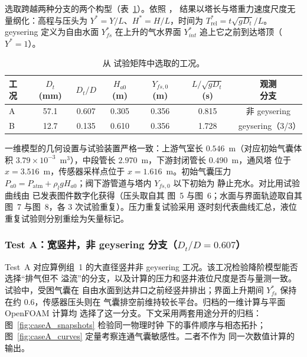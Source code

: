\documentclass[preprint,12pt]{elsarticle}
\begin{document}
选取跨越两种分支的两个构型（表~\ref{tab:cases}）。依照 \cite{vasconcelos2011}，
结果以塔长与塔重力速度尺度无量纲化：高程与压头为 $Y^{*}=Y/L$、$H^{*}=H/L$，时间为
$T_{\mathrm{rel}}^{*}=t\sqrt{gD_t}/L$。geysering 定义为自由水面 $Y^{*}_{fs}$ 在上升的气水界面
$Y^{*}_{int}$ 追上它之前到达塔顶（$Y^{*}=1$）。

\begin{table}[htbp]
\centering
\caption{从 \cite{vasconcelos2011} 试验矩阵中选取的工况。}
\label{tab:cases}
\begingroup
\small
\setlength{\tabcolsep}{3.5pt}
\begin{tabular}{@{}lcccccc@{}}
\toprule
工况 & \shortstack{$D_t$\\(mm)} & $D_t/D$ & \shortstack{$H_{a0}$\\(m)} &
\shortstack{$Y_{fs,0}$\\(m)} & \shortstack{$L/\sqrt{gD_t}$\\(s)} &
\shortstack{观测\\分支} \\
\midrule
A & 57.1 & 0.607 & 0.305 & 0.356 & 0.815 & 非 geysering \\
B & 12.7 & 0.135 & 0.610 & 0.356 & 1.728 & geysering（3/3） \\
\bottomrule
\end{tabular}
\endgroup
\end{table}

一维模型的几何设置与试验装置严格一致：上游气室长 $0.546$~m（对应初始气囊体积
$3.79\times10^{-3}$~m$^3$），中段管长 $2.970$~m，下游封闭管长 $0.490$~m，通风塔
位于 $x=3.516$~m，传感器采样点位于 $x=1.616$~m。初始气囊压力
$P_{a0}=P_{\mathrm{atm}}+\rho_l g H_{a0}$；阀下游管道与塔内 $Y_{fs,0}$ 以下初始为
静止充水。对比用试验曲线由 \cite{vasconcelos2011} 已发表图件数字化获得（压头取自其
图~5 与图~6；水面与界面轨迹取自其图~7 与图~8，各 3 次试验重复）。压力重复试验采用
逐时刻代表曲线汇总，液位重复试验则分别重绘为矢量标记。

\subsubsection{Test A：宽竖井，非 geysering 分支（$D_t/D=0.607$）}
\label{sec:tests:vw2011:caseA}

Test~A 对应算例组~1 的大直径竖井非 geysering 工况。该工况检验降阶模型能否选择“排气但不
溢流”的分支，以及计算的压力和竖井液位尺度是否与量测一致。试验中，受困气囊在
自由水面到达井口之前经竖井排出；界面上升期间 $Y^{*}_{fs}$ 保持在约 0.6，传感器压头则在
气囊排空前维持较长平台\citep{vasconcelos2011}。归档的一维计算与平面 OpenFOAM 计算均
选择了这一分支。下文采用两套用途分开的归档：图~\ref{fig:caseA_snapshots} 检验同一物理时钟
下的事件顺序与相态拓扑；图~\ref{fig:caseA_curves} 定量考察\mbox{连通气囊敏感性}。二者不作为
同一次数值计算的输出。
\end{document}
